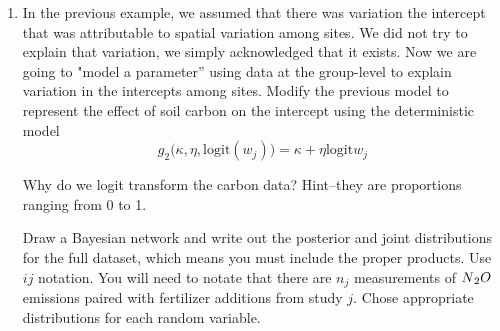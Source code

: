 \documentclass[12pt, oneside]{article}
\begin{document}
\begin{enumerate} [leftmargin=*]
where $y_{ij}$ is the $i^{th}$ observation of $N\textsubscript{2}O$ emissions in study $j$; $x_{ij}$ is a paired measurement of fertilizer addition and $\beta$ is the change in $N\textsubscript{2}O$ emissions per unit change in fertilizer addition. The model $g\big(\alpha_{j},\beta,x_{ij}\big)$ represents the hypothesis that the log of emissions increases in direct proportion to the log of fertilizer additions and that this increase is the same for all sites and fertilizer types\footnote{We will remedy this brave assumption later.}. The intercept $\alpha_{j}$ varies among studies as a random variable drawn from a distribution with parameters\footnote{Again, these parameters will \emph{not} be means and variances for any distributions except the normal and Poisson, but it turns out for this example, they are because we will use normals. Remember moment matching for other distributions.} $\mu_{\alpha}$ and $\varsigma_{\alpha}^{2}$. The fact that we explicitly represent variation among studies using the distribution of the $\alpha_{j}$ is what sets this analysis apart from conventional, single level regression that could be done separately for each of the individual sites or by pooling all of the data across sites to estimate a single intercept and slope. The $\sigma^{2}$ represents the uncertainty about $N\textsubscript{2}O$ emissions\footnote{We could have estimated separate $\sigma$ for each site, but this was not done by Carey (2007) and I wanted to maintain consistency with their analysis as much as possible.} and the $\varsigma_{\alpha}^{2}$ represents the uncertainty that arises as a result of variation among sites.$ $   
\fi

\newpage
\item In the previous example, we assumed that there was variation the intercept that was attributable to spatial variation among sites. We did not try to explain that variation, we simply acknowledged that it exists. Now we are going to "model a parameter'' using data at the group-level to explain variation in the intercepts among sites. Modify the previous model to represent the effect of soil carbon on the intercept using the deterministic model $$g_2\big(\kappa,\eta,\text{logit}(w_j)\big)  =\kappa + \eta \text{logit}w_j$$

Why do we logit transform the carbon data? Hint--they are proportions ranging from 0 to 1.


Draw a Bayesian network and write out the posterior and joint distributions for the full dataset, which means you must include the proper products. Use $ij$ notation. You will need to notate that there are $n_{j}$ measurements of {$N\textsubscript{2}O$ emissions paired with fertilizer additions} from study $j$. Chose appropriate distributions for each random variable.


\end{enumerate}
\end{document}
